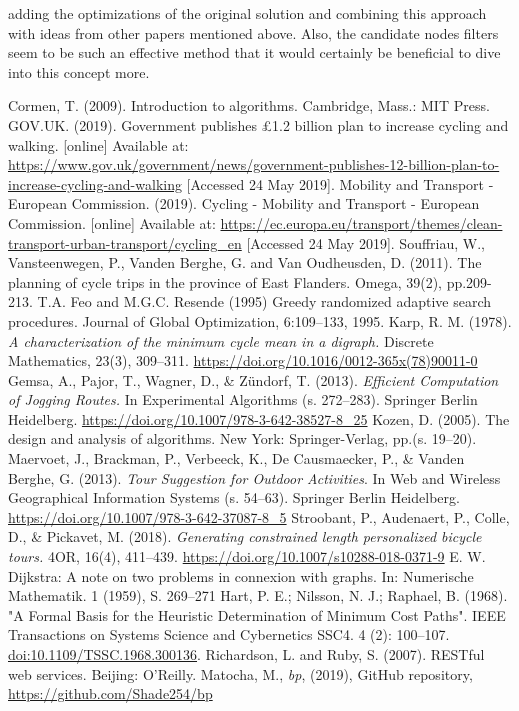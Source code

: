 \documentclass{ctuthesis}
\begin{document}
adding the optimizations of the original solution and combining this approach with ideas from other papers mentioned above. Also, the candidate nodes filters seem to be such an effective method that it would certainly be beneficial to dive into this concept more.

\begin{thebibliography}{1}
	 Cormen, T. (2009). Introduction to algorithms. Cambridge, Mass.: MIT Press.
	 GOV.UK. (2019). Government publishes £1.2 billion plan to increase cycling and walking. [online] Available at: \url{https://www.gov.uk/government/news/government-publishes-12-billion-plan-to-increase-cycling-and-walking} [Accessed 24 May 2019].
	 Mobility and Transport - European Commission. (2019). Cycling - Mobility and Transport - European Commission. [online] Available at: \url{https://ec.europa.eu/transport/themes/clean-transport-urban-transport/cycling_en} [Accessed 24 May 2019].
	 Souffriau, W., Vansteenwegen, P., Vanden Berghe, G. and Van Oudheusden, D. (2011). The planning of cycle trips in the province of East Flanders. Omega, 39(2), pp.209-213.
	 T.A. Feo and M.G.C. Resende (1995) Greedy randomized adaptive search procedures. Journal of Global Optimization, 6:109–133, 1995.
	Karp, R. M. (1978). \emph{A characterization of the minimum cycle mean in a digraph.} Discrete Mathematics, 23(3), 309–311. \url{https://doi.org/10.1016/0012-365x(78)90011-0} 
	Gemsa, A., Pajor, T., Wagner, D., \& Zündorf, T. (2013). \emph{Efficient Computation of Jogging Routes.} In Experimental Algorithms (s. 272–283). Springer Berlin Heidelberg. \url{https://doi.org/10.1007/978-3-642-38527-8_25} 
	Kozen, D. (2005). The design and analysis of algorithms. New York: Springer-Verlag, pp.(s. 19–20).
	Maervoet, J., Brackman, P., Verbeeck, K., De Causmaecker, P., \& Vanden Berghe, G. (2013). \emph{Tour Suggestion for Outdoor Activities}. In Web and Wireless Geographical Information Systems (s. 54–63). Springer Berlin Heidelberg. \url{https://doi.org/10.1007/978-3-642-37087-8_5} 
	Stroobant, P., Audenaert, P., Colle, D., \& Pickavet, M. (2018). \emph{Generating constrained length personalized bicycle tours.} 4OR, 16(4), 411–439. \url{https://doi.org/10.1007/s10288-018-0371-9} 
	 E. W. Dijkstra: A note on two problems in connexion with graphs. In: Numerische Mathematik. 1 (1959), S. 269–271
	 Hart, P. E.; Nilsson, N. J.; Raphael, B. (1968). "A Formal Basis for the Heuristic Determination of Minimum Cost Paths". IEEE Transactions on Systems Science and Cybernetics SSC4. 4 (2): 100–107. \url{doi:10.1109/TSSC.1968.300136}.
	 Richardson, L. and Ruby, S. (2007). RESTful web services. Beijing: O'Reilly.
	 Matocha, M., \emph{bp}, (2019), GitHub repository, \url{https://github.com/Shade254/bp}
\end{thebibliography}
\end{document}

